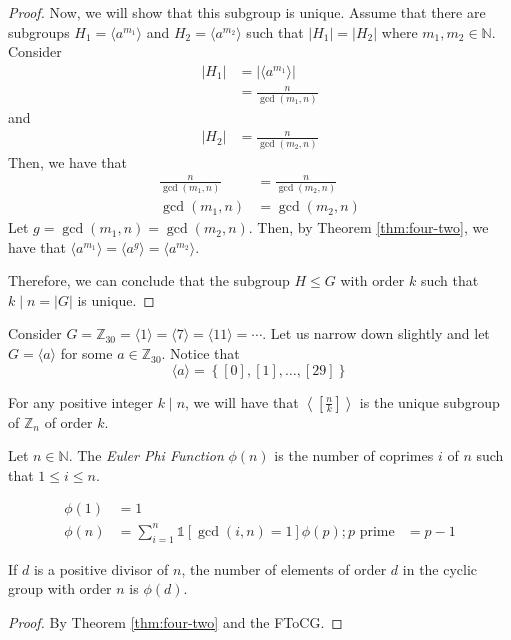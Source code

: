 \begin{proof}
    Now, we will show that this subgroup is unique. Assume that there are subgroups \(H_1 = \langle a^{m_1} \rangle\) and \(H_2 = \langle a^{m_2} \rangle\) such that \(|H_1| = |H_2|\) where \(m_1, m_2 \in \mathbb{N}\). Consider
    \[
    \begin{aligned}
        |H_1| &= \left|\langle a^{m_1} \rangle\right| \\
              &= \frac{n}{\gcd(m_1, n)}
    \end{aligned}
    \]
    and
    \[
    \begin{aligned}
        |H_2| &= \frac{n}{\gcd(m_2, n)}
    \end{aligned}
    \]
    Then, we have that
    \[
    \begin{aligned}
        \frac{n}{\gcd(m_1, n)} &= \frac{n}{\gcd(m_2, n)} \\
        \gcd(m_1, n) &= \gcd(m_2, n)
    \end{aligned}
    \]
    Let \(g = \gcd(m_1, n) = \gcd(m_2, n)\). Then, by Theorem \ref{thm:four-two}, we have that \(\langle a^{m_1} \rangle = \langle a^{g} \rangle = \langle a^{m_2} \rangle\).

    Therefore, we can conclude that the subgroup \(H \leq G\) with order \(k\) such that \(k \mid n = |G|\) is unique.
\end{proof}

\begin{nexample}
    Consider \(G = \mathbb{Z}_{30} = \langle 1 \rangle = \langle 7 \rangle = \langle 11 \rangle = \cdots\). Let us narrow down slightly and let \(G = \langle a \rangle\) for some \(a \in \mathbb{Z}_{30}\). Notice that
    \[
        \langle a \rangle = \left\{[0], [1], \ldots, [29]\right\}
    \]
\end{nexample}

\begin{corollary}
    For any positive integer \(k \mid n\), we will have that \(\left\langle \left[\frac{n}{k}\right] \right\rangle\) is the unique subgroup of \(\mathbb{Z}_n\) of order \(k\).
\end{corollary}

\begin{definition}
    Let \(n \in \mathbb{N}\). The \textit{Euler Phi Function} \(\phi(n)\) is the number of coprimes \(i\) of \(n\) such that \(1 \leq i \leq n\).
\end{definition}

\begin{nexample}
    \[
    \begin{aligned}
        \phi(1) &= 1 \\
        \phi(n) &= \sum_{i=1}^n \mathds{1}\left[\gcd(i, n) = 1\right]
        \phi(p); \text{\(p\) prime} &= p-1
    \end{aligned}
    \]
\end{nexample}

\begin{theorem}
    If \(d\) is a positive divisor of \(n\), the number of elements of order \(d\) in the cyclic group with order \(n\) is \(\phi(d)\).
\end{theorem}

\begin{proof}
    By Theorem \ref{thm:four-two} and the FToCG.
\end{proof}

